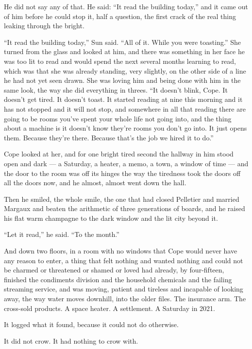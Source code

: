 \documentclass[11pt,openany]{book}
\begin{document}
He did not say any of that. He said: ``It read the building today,'' and it came out of him before he could stop it, half a question, the first crack of the real thing leaking through the bright.

``It read the building today,'' Sun said. ``All of it. While you were toasting.'' She turned from the glass and looked at him, and there was something in her face he was too lit to read and would spend the next several months learning to read, which was that she was already standing, very slightly, on the other side of a line he had not yet seen drawn. She was loving him and being done with him in the same look, the way she did everything in threes. ``It doesn't blink, Cope. It doesn't get tired. It doesn't toast. It started reading at nine this morning and it has not stopped and it will not stop, and somewhere in all that reading there are going to be rooms you've spent your whole life not going into, and the thing about a machine is it doesn't know they're rooms you don't go into. It just opens them. Because they're there. Because that's the job we hired it to do.''

Cope looked at her, and for one bright tired second the hallway in him stood open and dark --- a Saturday, a heater, a memo, a town, a window of time --- and the door to the room was off its hinges the way the tiredness took the doors off all the doors now, and he almost, almost went down the hall.

Then he smiled, the whole smile, the one that had closed Pelletier and married Margaux and beaten the arithmetic of three generations of boards, and he raised his flat warm champagne to the dark window and the lit city beyond it.

``Let it read,'' he said. ``To the month.''

And down two floors, in a room with no windows that Cope would never have any reason to enter, a thing that felt nothing and wanted nothing and could not be charmed or threatened or shamed or loved had already, by four-fifteen, finished the condiments division and the household chemicals and the failing streaming service, and was moving, patient and tireless and incapable of looking away, the way water moves downhill, into the older files. The insurance arm. The cross-sold products. A space heater. A settlement. A Saturday in 2021.

It logged what it found, because it could not do otherwise.

It did not crow. It had nothing to crow with.
\end{document}
